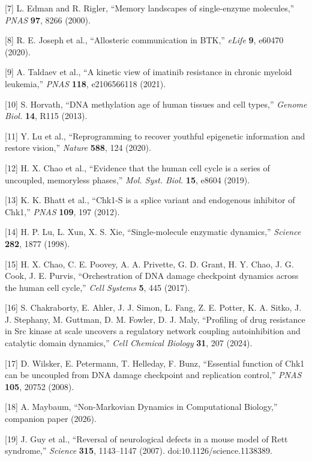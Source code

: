 \documentclass[
]{article}
\begin{document}
{[}7{]} L. Edman and R. Rigler, ``Memory landscapes of single-enzyme
molecules,'' \emph{PNAS} \textbf{97}, 8266 (2000).

{[}8{]} R. E. Joseph et al., ``Allosteric communication in BTK,''
\emph{eLife} \textbf{9}, e60470 (2020).

{[}9{]} A. Taldaev et al., ``A kinetic view of imatinib resistance in
chronic myeloid leukemia,'' \emph{PNAS} \textbf{118}, e2106566118
(2021).

{[}10{]} S. Horvath, ``DNA methylation age of human tissues and cell
types,'' \emph{Genome Biol.} \textbf{14}, R115 (2013).

{[}11{]} Y. Lu et al., ``Reprogramming to recover youthful epigenetic
information and restore vision,'' \emph{Nature} \textbf{588}, 124
(2020).

{[}12{]} H. X. Chao et al., ``Evidence that the human cell cycle is a
series of uncoupled, memoryless phases,'' \emph{Mol. Syst. Biol.}
\textbf{15}, e8604 (2019).

{[}13{]} K. K. Bhatt et al., ``Chk1-S is a splice variant and endogenous
inhibitor of Chk1,'' \emph{PNAS} \textbf{109}, 197 (2012).

{[}14{]} H. P. Lu, L. Xun, X. S. Xie, ``Single-molecule enzymatic
dynamics,'' \emph{Science} \textbf{282}, 1877 (1998).

{[}15{]} H. X. Chao, C. E. Poovey, A. A. Privette, G. D. Grant, H. Y.
Chao, J. G. Cook, J. E. Purvis, ``Orchestration of DNA damage checkpoint
dynamics across the human cell cycle,'' \emph{Cell Systems} \textbf{5},
445 (2017).

{[}16{]} S. Chakraborty, E. Ahler, J. J. Simon, L. Fang, Z. E. Potter,
K. A. Sitko, J. J. Stephany, M. Guttman, D. M. Fowler, D. J. Maly,
``Profiling of drug resistance in Src kinase at scale uncovers a
regulatory network coupling autoinhibition and catalytic domain
dynamics,'' \emph{Cell Chemical Biology} \textbf{31}, 207 (2024).

{[}17{]} D. Wilsker, E. Petermann, T. Helleday, F. Bunz, ``Essential
function of Chk1 can be uncoupled from DNA damage checkpoint and
replication control,'' \emph{PNAS} \textbf{105}, 20752 (2008).

{[}18{]} A. Maybaum, ``Non-Markovian Dynamics in Computational
Biology,'' companion paper (2026).

{[}19{]} J. Guy et al., ``Reversal of neurological defects in a mouse
model of Rett syndrome,'' \emph{Science} \textbf{315}, 1143--1147
(2007). doi:10.1126/science.1138389.
\end{document}
